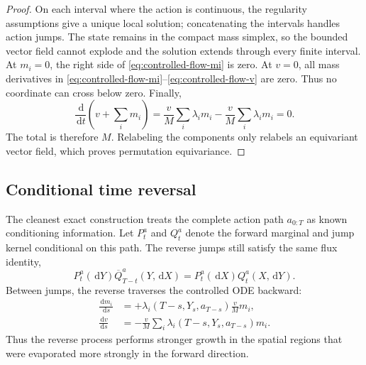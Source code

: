 \documentclass[10pt]{article}
\theoremstyle{definition}
\theoremstyle{remark}
\newcommand{\dd}{\,\mathrm{d}}
\begin{document}
\begin{proof}
On each interval where the action is continuous, the regularity assumptions
give a unique local solution; concatenating the intervals handles action
jumps.  The state remains
in the compact mass simplex, so the bounded vector field cannot explode and
the solution extends through every finite interval.  At $m_i=0$, the right
side of \eqref{eq:controlled-flow-mi} is zero.  At $v=0$, all mass
derivatives in \eqref{eq:controlled-flow-mi}--\eqref{eq:controlled-flow-v}
are zero.  Thus no coordinate can cross below zero.  Finally,
\begin{equation*}
  \frac{\dd}{\dd t}\left(v+\sum_i m_i\right)
  =\frac{v}{M}\sum_i\lambda_i m_i
   -\frac{v}{M}\sum_i\lambda_i m_i=0.
\end{equation*}
The total is therefore $M$.  Relabeling the components only relabels an
equivariant vector field, which proves permutation equivariance.
\end{proof}

\subsection{Conditional time reversal}

The cleanest exact construction treats the complete action path
$a_{0:T}$ as known conditioning information.  Let $P_t^a$ and $Q_t^a$
denote the forward marginal and jump kernel conditional on this path.  The
reverse jumps still satisfy the same flux identity,
\begin{equation}
  P_t^a(\dd Y)\overline Q_{T-t}^a(Y,\dd X)
  =P_t^a(\dd X)Q_t^a(X,\dd Y).
  \label{eq:controlled-flux-reversal}
\end{equation}
Between jumps, the reverse traverses the controlled ODE backward:
\begin{align}
  \frac{\dd m_i}{\dd s}
  &=+\lambda_i(T-s,Y_s,a_{T-s})\frac{v}{M}m_i,
  \label{eq:controlled-reverse-mi}\\
  \frac{\dd v}{\dd s}
  &=-\frac{v}{M}\sum_i
    \lambda_i(T-s,Y_s,a_{T-s})m_i.
  \label{eq:controlled-reverse-v}
\end{align}
Thus the reverse process performs stronger growth in the spatial regions
that were evaporated more strongly in the forward direction.
\end{document}
